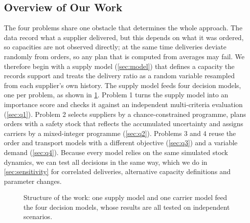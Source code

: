 \documentclass[11pt,a4paper]{article}
\begin{document}
\subsection{Overview of Our Work}
The four problems share one obstacle that determines the whole approach.
The data record what a supplier delivered, but this depends on what it was ordered, so capacities are not observed directly; at the same time deliveries deviate randomly from orders, so any plan that is computed from averages may fail.
We therefore begin with a supply model (\cref{sec:model}) that defines a capacity the records support and treats the delivery ratio as a random variable resampled from each supplier's own history.
The supply model feeds four decision models, one per problem, as shown in \cref{fig:flow}.
Problem 1 turns the supply model into an importance score and checks it against an independent multi-criteria evaluation (\cref{sec:q1}).
Problem 2 selects suppliers by a chance-constrained programme, plans orders with a safety stock that reflects the accumulated uncertainty and assigns carriers by a mixed-integer programme (\cref{sec:q2}).
Problems 3 and 4 reuse the order and transport models with a different objective (\cref{sec:q3}) and a variable demand (\cref{sec:q4}).
Because every model relies on the same simulated stock dynamics, we can test all decisions in the same way, which we do in \cref{sec:sensitivity} for correlated deliveries, alternative capacity definitions and parameter changes.

\begin{figure}[ht]
\centering
{}
\caption{Structure of the work: one supply model and one carrier model feed the four decision models, whose results are all tested on independent scenarios.}\label{fig:flow}
\end{figure}
\end{document}
